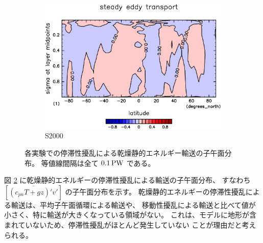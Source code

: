 \documentclass[body]{subfiles}
\begin{document}
\begin{figure}[t]
\begin{subfigure}{.4\textwidth}
		\includegraphics[width=\columnwidth]{S2000/MeriHeatTransTest@dryStatEn_SE,time=7300:7665-crop-rotate.pdf}
		\caption{S2000}\label{乾燥静的エネルギー停滞性擾乱S2000}
	\end{subfigure}
	\caption[各実験でのに停滞性擾乱依る乾燥静的エネルギー輸送の子午面分布]{
		各実験での停滞性擾乱による乾燥静的エネルギー輸送の子午面分布。
		等値線間隔は全て \(0.1\hmu{PW}\) である。
	}\label{乾燥静的エネルギー停滞性擾乱}
\end{figure}

図 \ref{乾燥静的エネルギー停滞性擾乱} に乾燥静的エネルギーの停滞性擾乱による輸送の子午面分布、
すなわち \([\overline{(c_{pn}T+gz)'v'}]\) の子午面分布を示す。
乾燥静的エネルギーの停滞性擾乱による輸送は、平均子午面循環による輸送や、
移動性擾乱による輸送と比べて値が小さく、特に輸送が大きくなっている領域がない。
これは、モデルに地形が含まれていないため、停滞性擾乱がほとんど発生していない
ことが理由だと考えられる。
\end{document}
